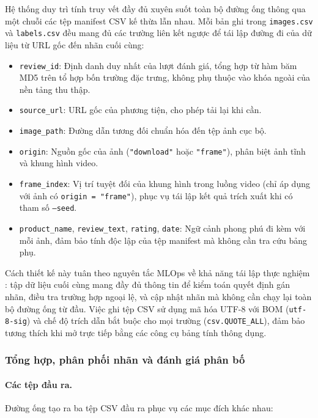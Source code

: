 Hệ thống duy trì tính truy vết đầy đủ xuyên suốt toàn bộ
đường ống thông qua một chuỗi các tệp manifest CSV kế thừa lẫn nhau. Mỗi bản ghi
trong \texttt{images.csv} và \texttt{labels.csv} đều mang đủ các trường liên kết
ngược để tái lập đường đi của dữ liệu từ URL gốc đến nhãn cuối cùng:

\begin{itemize}
    \item \texttt{review\_id}: Định danh duy nhất của lượt đánh giá, tổng hợp từ hàm
    băm MD5 trên tổ hợp bốn trường đặc trưng, không phụ thuộc vào khóa ngoài của nền
    tảng thu thập.
    \item \texttt{source\_url}: URL gốc của phương tiện, cho phép tải lại khi cần.
    \item \texttt{image\_path}: Đường dẫn tương đối chuẩn hóa đến tệp ảnh cục bộ.
    \item \texttt{origin}: Nguồn gốc của ảnh (\texttt{"download"} hoặc
    \texttt{"frame"}), phân biệt ảnh tĩnh và khung hình video.
    \item \texttt{frame\_index}: Vị trí tuyệt đối của khung hình trong luồng video
    (chỉ áp dụng với ảnh có \texttt{origin = "frame"}), phục vụ tái lập kết quả
    trích xuất khi có tham số \texttt{--seed}.
    \item \texttt{product\_name}, \texttt{review\_text}, \texttt{rating},
    \texttt{date}: Ngữ cảnh phong phú đi kèm với mỗi ảnh, đảm bảo tính độc lập của
    tệp manifest mà không cần tra cứu bảng phụ.
\end{itemize}

Cách thiết kế này tuân theo nguyên tắc MLOps về khả năng tái lập thực nghiệm
: tập dữ liệu cuối cùng mang đầy đủ thông tin để
kiểm toán quyết định gán nhãn, điều tra trường hợp ngoại lệ, và cập nhật nhãn mà
không cần chạy lại toàn bộ đường ống từ đầu. Việc ghi tệp CSV sử dụng mã hóa
UTF-8 với BOM (\texttt{utf-8-sig}) và chế độ trích dẫn bắt buộc cho mọi trường
(\texttt{csv.QUOTE\_ALL}), đảm bảo tương thích khi mở trực tiếp bằng các công cụ
bảng tính thông dụng.



\subsubsection{Tổng hợp, phân phối nhãn và đánh giá phân bố}

\paragraph{Các tệp đầu ra.}
Đường ống tạo ra ba tệp CSV đầu ra phục vụ các mục đích khác nhau:

